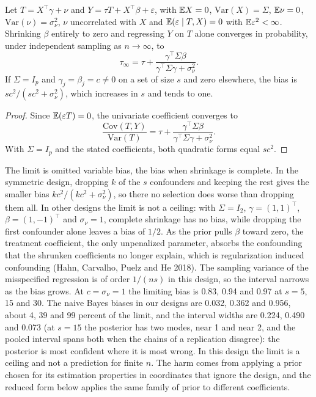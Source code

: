 \begin{proposition}\label{crit:prop:ric}\label{crit:prop:default}
Let $T = X^\top\gamma + \nu$ and $Y = \tau T + X^\top\beta + \varepsilon$, with $\mathbb{E} X = 0$, $\mathrm{Var}(X) = \Sigma$, $\mathbb{E} \nu = 0$, $\mathrm{Var}(\nu) = \sigma_\nu^2$, $\nu$ uncorrelated with $X$ and $\mathbb{E}(\varepsilon \mid T, X) = 0$ with $\mathbb{E} \varepsilon^2 < \infty$. Shrinking $\beta$ entirely to zero and regressing $Y$ on $T$ alone converges in probability, under independent sampling as $n \to \infty$, to
\[
\tau_\infty = \tau + \frac{\gamma^\top\Sigma\beta}{\gamma^\top\Sigma\gamma + \sigma_\nu^2}.
\]
If $\Sigma = I_p$ and $\gamma_j = \beta_j = c \ne 0$ on a set of size $s$ and zero elsewhere, the bias is $sc^2/(sc^2 + \sigma_\nu^2)$, which increases in $s$ and tends to one.
\end{proposition}
\begin{proof}
Since $\mathbb{E}(\varepsilon T) = 0$, the univariate coefficient converges to
\[
\frac{\mathrm{Cov}(T,Y)}{\mathrm{Var}(T)} = \tau + \frac{\gamma^\top\Sigma\beta}{\gamma^\top\Sigma\gamma + \sigma_\nu^2}.
\]
With $\Sigma = I_p$ and the stated coefficients, both quadratic forms equal $sc^2$.
\end{proof}

The limit is omitted variable bias, the bias when shrinkage is complete. In the symmetric design, dropping $k$ of the $s$ confounders and keeping the rest gives the smaller bias $kc^2/(kc^2 + \sigma_\nu^2)$, so there no selection does worse than dropping them all. In other designs the limit is not a ceiling: with $\Sigma = I_2$, $\gamma = (1, 1)^\top$, $\beta = (1, -1)^\top$ and $\sigma_\nu = 1$, complete shrinkage has no bias, while dropping the first confounder alone leaves a bias of $1/2$. As the prior pulls $\beta$ toward zero, the treatment coefficient, the only unpenalized parameter, absorbs the confounding that the shrunken coefficients no longer explain, which is regularization induced confounding (Hahn, Carvalho, Puelz and He 2018). The sampling variance of the misspecified regression is of order $1/(ns)$ in this design, so the interval narrows as the bias grows. At $c = \sigma_\nu = 1$ the limiting bias is 0.83, 0.94 and 0.97 at $s = 5$, 15 and 30. The naive Bayes biases in our designs are 0.032, 0.362 and 0.956, about 4, 39 and 99 percent of the limit, and the interval widths are 0.224, 0.490 and 0.073 (at $s = 15$ the posterior has two modes, near 1 and near 2, and the pooled interval spans both when the chains of a replication disagree): the posterior is most confident where it is most wrong. In this design the limit is a ceiling and not a prediction for finite $n$. The harm comes from applying a prior chosen for its estimation properties in coordinates that ignore the design, and the reduced form below applies the same family of prior to different coefficients.

